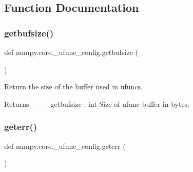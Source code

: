 \subsection{Function Documentation}
\mbox{\label{namespacenumpy_1_1core_1_1__ufunc__config_adcdf967493ff6c8180ea677ffd01342e}} 
\subsubsection{\texorpdfstring{getbufsize()}{getbufsize()}}
{\footnotesize\ttfamily def numpy.\+core.\+\_\+ufunc\+\_\+config.\+getbufsize (\begin{DoxyParamCaption}{ }\end{DoxyParamCaption})}

\begin{DoxyVerb}Return the size of the buffer used in ufuncs.

Returns
-------
getbufsize : int
    Size of ufunc buffer in bytes.\end{DoxyVerb}
 \mbox{\label{namespacenumpy_1_1core_1_1__ufunc__config_afcd6f622aa3b9d333e5fd614095c9f06}} 
\subsubsection{\texorpdfstring{geterr()}{geterr()}}
{\footnotesize\ttfamily def numpy.\+core.\+\_\+ufunc\+\_\+config.\+geterr (\begin{DoxyParamCaption}{ }\end{DoxyParamCaption})}

